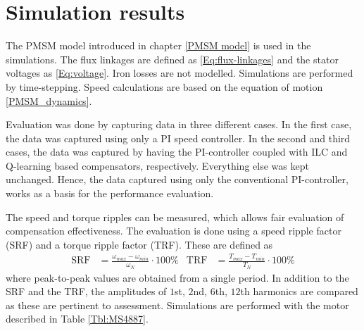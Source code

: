 \section{Simulation results}

The PMSM model introduced in chapter \ref{PMSM model} is used in the simulations. The flux linkages are defined as \eqref{Eq:flux-linkages} and the stator voltages as \eqref{Eq:voltage}. Iron losses are not modelled. Simulations are performed by time-stepping. Speed calculations are based on the equation of motion \eqref{PMSM_dynamics}.

Evaluation was done by capturing data in three different cases. In the first case, the data was captured using only a PI speed controller. In the second and third cases, the data was captured by having the PI-controller coupled with ILC and Q-learning based compensators, respectively. Everything else was kept unchanged. Hence, the data captured using only the conventional PI-controller, works as a basis for the performance evaluation.

The speed and torque ripples can be measured, which allows fair evaluation of compensation effectiveness. The evaluation is done using a speed ripple factor (SRF) and a torque ripple factor (TRF). These are defined as \cite{ILC:2005}
\begin{align}
    \text{SRF} &= \frac{\omega_{max} - \omega_{min}}{\omega_N} \cdot 100\% & \text{TRF} &= \frac{T_{max} - T_{min}}{T_N} \cdot 100\%
    \label{eq:ripple-factor}
\end{align} 
where peak-to-peak values are obtained from a single period. In addition to the SRF and the TRF, the amplitudes of $1$st, $2$nd, $6$th, $12$th harmonics are compared as these are pertinent to assessment. Simulations are performed with the motor described in Table \ref{Tbl:MS4887}.




